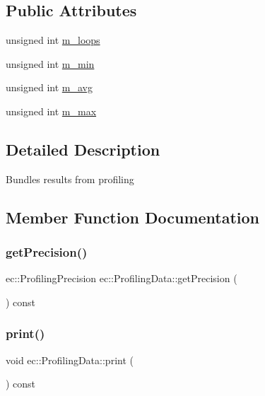 \subsection*{Public Attributes}
\begin{DoxyCompactItemize}
\item 
unsigned int \mbox{\hyperlink{structec_1_1_profiling_data_ab25c4aecf24c13751b548c9fc4f740e3}{m\+\_\+loops}}
\item 
unsigned int \mbox{\hyperlink{structec_1_1_profiling_data_a2dd2e0b50fb962c7b067906f60542dd5}{m\+\_\+min}}
\item 
unsigned int \mbox{\hyperlink{structec_1_1_profiling_data_a42ec8226feef8d7cad67266948bc44fa}{m\+\_\+avg}}
\item 
unsigned int \mbox{\hyperlink{structec_1_1_profiling_data_a7a9e909358674ad094ba07da2b1aa4ce}{m\+\_\+max}}
\end{DoxyCompactItemize}


\subsection{Detailed Description}
Bundles results from profiling 

\subsection{Member Function Documentation}
\mbox{\label{structec_1_1_profiling_data_a08d24bb1ef0fbabe2a670b577f56782f}} 
\subsubsection{\texorpdfstring{get\+Precision()}{getPrecision()}}
{\footnotesize\ttfamily ec\+::\+Profiling\+Precision ec\+::\+Profiling\+Data\+::get\+Precision (\begin{DoxyParamCaption}{ }\end{DoxyParamCaption}) const}

\mbox{\label{structec_1_1_profiling_data_ab664a06ab3c6cad1328e417be7f5b558}} 
\subsubsection{\texorpdfstring{print()}{print()}}
{\footnotesize\ttfamily void ec\+::\+Profiling\+Data\+::print (\begin{DoxyParamCaption}{ }\end{DoxyParamCaption}) const}

